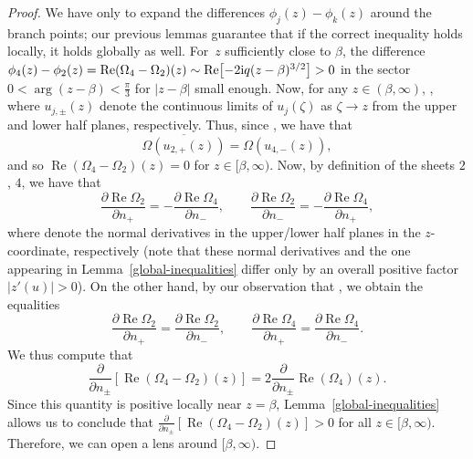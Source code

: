 \documentclass[pdftex]{sigma}
\numberwithin{equation}{section}
\begin{document}
 \begin{proof}
 We have only to expand the differences $\phi_j(z)-\phi_k(z)$ around the branch points; our previous lemmas guarantee that if the correct inequality holds locally, it holds globally as well.
 For~$z$ sufficiently close to $\beta$, the difference ${\phi_4(z) - \phi_2(z) = \operatorname{Re}(\Omega_4 - \Omega_2)(z) \sim \operatorname{Re}\bigl[-2{\rm i}q (z-\beta)^{3/2}\bigr] >0}$ in the sector $0< \arg (z-\beta) < \frac{\pi}{3}$ for $|z-\beta|$ small enough.
 Now, for any $z \in (\beta,\infty)$, , where $u_{j,\pm}(z)$ denote the continuous limits of $u_j(\zeta)$ as $\zeta \to z$ from the upper and lower half planes, respectively. Thus, since , we have that
 \begin{equation*}
 \overline{\Omega(u_{2,+}(z))} = \Omega(u_{4,-}(z)),
 \end{equation*}
 and so $\operatorname{Re}(\Omega_4 - \Omega_2)(z) = 0$ for $z\in [\beta,\infty)$. Now, by definition of the sheets $2$, $4$, we have that
 \begin{equation*}
 \frac{\partial \operatorname{Re}\Omega_2}{\partial n_+} = -\frac{\partial \operatorname{Re}\Omega_4}{\partial n_-},\qquad
 \frac{\partial \operatorname{Re}\Omega_2}{\partial n_-} = -\frac{\partial \operatorname{Re}\Omega_4}{\partial n_+},
 \end{equation*}
 where  denote the normal derivatives in the upper/lower half planes in the $z$-coordinate, respectively (note that these normal derivatives and the one appearing in Lemma~\ref{global-inequalities} differ only by an overall positive factor $|z'(u)| >0 $).
 On the other hand, by our observation that , we obtain the equalities
 \begin{equation*}
 \frac{\partial \operatorname{Re}\Omega_2}{\partial n_+} = \frac{\partial \operatorname{Re}\Omega_2}{\partial n_-},\qquad
 \frac{\partial \operatorname{Re}\Omega_4}{\partial n_+} = \frac{\partial \operatorname{Re}\Omega_4}{\partial n_-}.
 \end{equation*}
 We thus compute that
 \begin{equation*}
 \frac{\partial}{\partial n_{\pm}} [\operatorname{Re}(\Omega_4 - \Omega_2)(z)] = 2\frac{\partial}{\partial n_{\pm}}\operatorname{Re}(\Omega_4)(z).
 \end{equation*}
 Since this quantity is positive locally near $z=\beta$, Lemma~\ref{global-inequalities} allows us to conclude that \sloppy $\frac{\partial}{\partial n_{\pm}} [\operatorname{Re}(\Omega_4 - \Omega_2)(z)] >0$ for all $z \in [\beta,\infty)$.
 Therefore, we can open a lens around $[\beta,\infty)$.


\end{proof}
\end{document}
